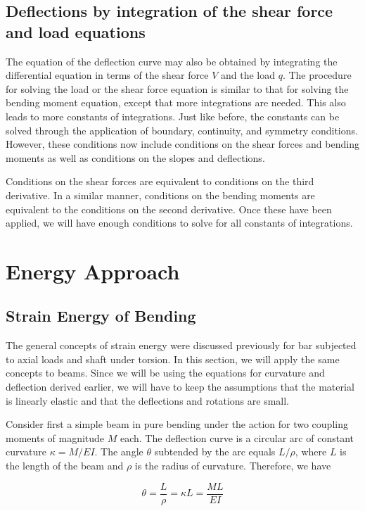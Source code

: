 \documentclass[
10pt,
a4paper,
openany,
svgnames,
]{book} %
\begin{document}
\subsection{Deflections by integration of the shear force and load equations}

The equation of the deflection curve may also be obtained by integrating the differential equation in terms of the shear force $V$ and the load $q$. The procedure for solving the load or the shear force equation is similar to that for solving the bending moment equation, except that more integrations are needed. This also leads to more constants of integrations. Just like before, the constants can be solved through the application of boundary, continuity, and symmetry conditions. However, these conditions now include conditions on the shear forces and bending moments as well as conditions on the slopes and deflections.

Conditions on the shear forces are equivalent to conditions on the third derivative. In a similar manner, conditions on the bending moments are equivalent to the conditions on the second derivative. Once these have been applied, we will have enough conditions to solve for all constants of integrations.

\section{Energy Approach}

\subsection{Strain Energy of Bending}

The general concepts of strain energy were discussed previously for bar subjected to axial loads and shaft under torsion. In this section, we will apply the same concepts to beams. Since we will be using the equations for curvature and deflection derived earlier, we will have to keep the assumptions that the material is linearly elastic and that the deflections and rotations are small.

Consider first a simple beam in pure bending under the action for two coupling moments of magnitude $M$ each. The deflection curve is a circular arc of constant curvature $\kappa = M/EI$. The angle $\theta$ subtended by the arc equals $L/\rho$, where $L$ is the length of the beam and $\rho$ is the radius of curvature. Therefore, we have

\begin{equation} \label{eqn: curvature-moment relation}
  \theta  = \frac{L}{\rho } = \kappa L = \frac{ML}{EI}
\end{equation}
\end{document}
